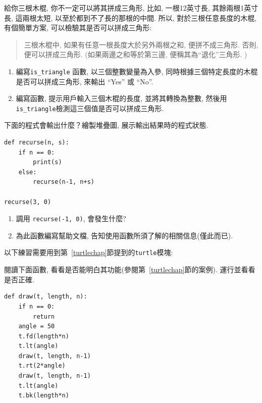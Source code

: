 \documentclass[10pt]{book}
\begin{document}
\begin{exercise}

給你三根木棍, 你不一定可以將其拼成三角形, 比如, 一根12英寸長, 
其餘兩根1英寸長, 這兩根太短, 以至於都到不了長的那根的中間. 
所以, 對於三根任意長度的木棍, 有個簡單方案, 可以檢驗其是否可以拼成三角形:

\begin{quotation}
三根木棍中, 如果有任意一根長度大於另外兩根之和, 便拼不成三角形. 
否則, 便可以拼成三角形. (如果兩邊之和等於第三邊, 便稱其為``退化''三角形. )
\end{quotation}

\begin{enumerate}

\item 編寫\verb"is_triangle" 函數, 以三個整數變量為入參, 
同時根據三個特定長度的木棍是否可以拼成三角形, 來輸出 ``Yes'' 或 ``No''. 

\item 編寫函數, 提示用戶輸入三個木棍的長度, 並將其轉換為整數, 
然後用\verb"is_triangle"檢測這三個值是否可以拼成三角形. 
\end{enumerate}

\end{exercise}

\begin{exercise}
下面的程式會輸出什麼？繪製堆疊圖, 展示輸出結果時的程式狀態.

\begin{verbatim}
def recurse(n, s):
    if n == 0:
        print(s)
    else:
        recurse(n-1, n+s)

recurse(3, 0)
\end{verbatim}

\begin{enumerate}

\item 調用 {\tt  recurse(-1, 0)}, 會發生什麼?

\item 為此函數編寫幫助文檔, 告知使用函數所須了解的相關信息(僅此而已).

\end{enumerate}

\end{exercise}

以下練習需要用到第~\ref{turtlechap}節提到的{\tt turtle}模塊:

\begin{exercise}
閱讀下面函數, 看看是否能明白其功能(參閱第~\ref{turtlechap}節的案例). 
運行並看看是否正確. 

\begin{verbatim}
def draw(t, length, n):
    if n == 0:
        return
    angle = 50
    t.fd(length*n)
    t.lt(angle)
    draw(t, length, n-1)
    t.rt(2*angle)
    draw(t, length, n-1)
    t.lt(angle)
    t.bk(length*n)
\end{verbatim}

\end{exercise}
\end{document}
